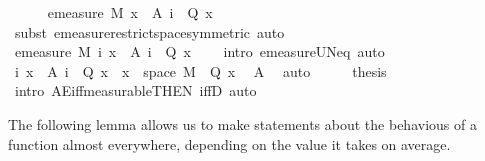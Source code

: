 \begin{isabellebody}
\ \ \ \ \isamarkupfalse%
\ {\isachardoublequoteopen}emeasure\ M\ {\isacharbraceleft}{\kern0pt}x\ {\isasymin}\ A\ i{\isachardot}{\kern0pt}\ {\isasymnot}\ Q\ x{\isacharbraceright}{\kern0pt}\ {\isacharequal}{\kern0pt}\ {}{\isachardoublequoteclose}\ \isamarkupfalse%
\ {\isacharparenleft}{\kern0pt}subst\ emeasure{\isacharunderscore}{\kern0pt}restrict{\isacharunderscore}{\kern0pt}space{\isacharbrackleft}{\kern0pt}symmetric{\isacharbrackright}{\kern0pt}{\isacharcomma}{\kern0pt}\ auto{\isacharparenright}{\kern0pt}\isanewline
\ \ \isacommand{{\isacharbraceright}{\kern0pt}}\isamarkupfalse%
\isanewline
\ \ \isamarkupfalse%
\ {\isachardoublequoteopen}emeasure\ M\ {\isacharparenleft}{\kern0pt}{\isasymUnion}i{\isachardot}{\kern0pt}\ {\isacharbraceleft}{\kern0pt}x\ {\isasymin}\ A\ i{\isachardot}{\kern0pt}\ {\isasymnot}\ Q\ x{\isacharbraceright}{\kern0pt}{\isacharparenright}{\kern0pt}\ {\isacharequal}{\kern0pt}\ {}{\isachardoublequoteclose}\ \isamarkupfalse%
\ {\isacharparenleft}{\kern0pt}intro\ emeasure{\isacharunderscore}{\kern0pt}UN{\isacharunderscore}{\kern0pt}eq{\isacharunderscore}{\kern0pt}{}{\isacharcomma}{\kern0pt}\ auto{\isacharparenright}{\kern0pt}\isanewline
\ \ \isamarkupfalse%
\ \isamarkupfalse%
\ {\isachardoublequoteopen}{\isacharparenleft}{\kern0pt}{\isasymUnion}i{\isachardot}{\kern0pt}\ {\isacharbraceleft}{\kern0pt}x\ {\isasymin}\ A\ i{\isachardot}{\kern0pt}\ {\isasymnot}\ Q\ x{\isacharbraceright}{\kern0pt}{\isacharparenright}{\kern0pt}\ {\isacharequal}{\kern0pt}\ {\isacharbraceleft}{\kern0pt}x\ {\isasymin}\ space\ M{\isachardot}{\kern0pt}\ {\isasymnot}\ Q\ x{\isacharbraceright}{\kern0pt}{\isachardoublequoteclose}\ \isamarkupfalse%
\ A\ \isamarkupfalse%
\ auto\isanewline
\ \ \isamarkupfalse%
\ \isamarkupfalse%
\ {\isacharquery}{\kern0pt}thesis\ \isamarkupfalse%
\ {\isacharparenleft}{\kern0pt}intro\ AE{\isacharunderscore}{\kern0pt}iff{\isacharunderscore}{\kern0pt}measurable{\isacharbrackleft}{\kern0pt}THEN\ iffD{}{\isacharbrackright}{\kern0pt}{\isacharcomma}{\kern0pt}\ auto{\isacharparenright}{\kern0pt}\isanewline
{}\isamarkupfalse%
%
\endisatagproof
{\isafoldproof}%
%
\isadelimproof
%
\endisadelimproof
%
\begin{isamarkuptext}%
The following lemma allows us to make statements about the behavious of a function almost everywhere, depending on the value it takes on average.%

\end{isamarkuptext}
\end{isabellebody}
